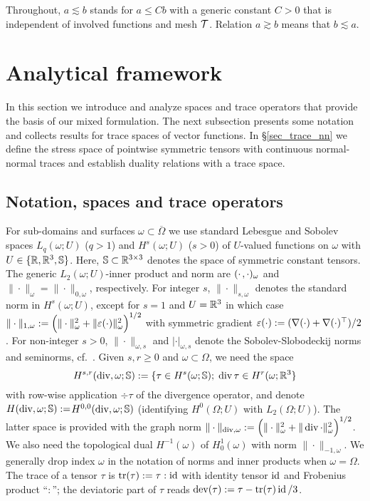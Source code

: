 \documentclass[11pt]{article}
\begin{document}
Throughout, $a\lesssim b$ stands for $a\le Cb$ with a generic constant $C>0$
that is independent of involved functions and mesh $\mesh$.
Relation $a\gtrsim b$ means that $b\lesssim a$.

\section{Analytical framework} \label{sec_trace}

In this section we introduce and analyze spaces and trace operators that provide the basis
of our mixed formulation. The next subsection presents some notation
and collects results for trace spaces of vector functions.
In \S\ref{sec_trace_nn} we define the stress space of pointwise symmetric tensors
with continuous normal-normal traces and establish duality relations with
a trace space.

\subsection{Notation, spaces and trace operators}

For sub-domains and surfaces $\omega\subset\overline{\Omega}$ we use standard Lebesgue
and Sobolev spaces $L_q(\omega;U)$ ($q>1$) and $H^s(\omega;U)$ ($s>0$) of
$U$-valued functions on $\omega$ with $U\in\{\R,\Rt,\SS\}$.
Here, $\SS\subset\Rtt$ denotes the space of symmetric constant tensors.
The generic $L_2(\omega;U)$-inner product and norm are $\vdual{\cdot}{\cdot}_\omega$
and $\|\cdot\|_\omega=\|\cdot\|_{0,\omega}$, respectively.
For integer $s$, $\|\cdot\|_{s,\omega}$ denotes the standard norm in $H^s(\omega;U)$,
except for $s=1$ and $U=\Rt$ in which case
$\|\cdot\|_{1,\omega}:=\Bigl(\|\cdot\|_\omega^2+\|\strain{\cdot}\|_\omega^2\Bigr)^{1/2}$
with symmetric gradient $\strain{\cdot}:=(\grad(\cdot)+\grad(\cdot)^\top)/2$.
For non-integer $s>0$, $\|\cdot\|_{\omega,s}$ and $|\cdot|_{\omega,s}$ denote the
Sobolev-Slobodeckij norms and seminorms, cf.~\cite{Adams}.
Given $s,r\ge 0$ and $\omega\subset\Omega$, we need the space
\[
   H^{s,r}(\div,\omega;\SS):=\{\tau\in H^s(\omega;\SS);\; \div\tau\in H^r(\omega;\Rt\}
\]
with row-wise application $\div\tau$ of the divergence operator, and denote
$H(\div,\omega;\SS) :=$\linebreak $H^{0,0}(\div,\omega;\SS)$
(identifying $H^0(\Omega;U)$ with $L_2(\Omega;U)$).
The latter space is provided with the graph norm
$\|\cdot\|_{\div,\omega}:=\Bigl(\|\cdot\|_\omega^2+\|\div\cdot\|_\omega^2\Bigr)^{1/2}$.
We also need the topological dual $H^{-1}(\omega)$ of $H^1_0(\omega)$ with norm
$\|\cdot\|_{-1,\omega}$.
We generally drop index $\omega$ in the notation of norms and inner products when $\omega=\Omega$.
The trace of a tensor $\tau$ is $\tr(\tau):=\tau:\id$ with identity tensor $\id$
and Frobenius product ``$:$''; the deviatoric part of $\tau$ reads
$\dev(\tau):=\tau-\tr(\tau)\id/3$.
\end{document}
